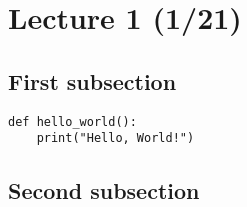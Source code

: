 
\section[Lecture 1 (Date) -- {\it Notes for Lectures on C Programming}]{Lecture 1 (1/21)}

\subsection{First subsection}
\begin{verbatim}
def hello_world():
    print("Hello, World!")
\end{verbatim}


\subsection{Second subsection}
